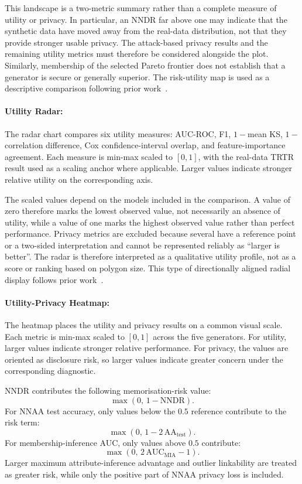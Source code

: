 This landscape is a two-metric summary rather than a complete measure of
utility or privacy. In particular, an NNDR far above one may indicate
that the synthetic data have moved away from the real-data distribution,
not that they provide stronger usable privacy. The attack-based privacy
results and the remaining utility metrics must therefore be considered
alongside the plot. Similarly, membership of the selected Pareto frontier
does not establish that a generator is secure or generally superior. The
risk-utility map is used as a descriptive comparison following prior
work~\cite{thees2025beyond}.


\paragraph{Utility Radar:}
\label{sec:eval:aggregate:radar}
The radar chart compares six utility measures: AUC-ROC, F1,
$1-$mean KS, $1-$correlation difference, Cox confidence-interval
overlap, and feature-importance agreement. Each measure is min-max
scaled to $[0,1]$, with the real-data TRTR result used as a scaling
anchor where applicable. Larger values indicate stronger relative
utility on the corresponding axis.

The scaled values depend on the models included in the comparison. A
value of zero therefore marks the lowest observed value, not necessarily
an absence of utility, while a value of one marks the highest observed
value rather than perfect performance. Privacy metrics are excluded
because several have a reference point or a two-sided interpretation and
cannot be represented reliably as ``larger is better''. The radar is
therefore interpreted as a qualitative utility profile, not as a score or
ranking based on polygon size. This type of directionally aligned radial
display follows prior work~\cite{thees2025beyond}.

\paragraph{Utility-Privacy Heatmap:}
\label{sec:eval:aggregate:heatmap}
The heatmap places the utility and privacy results on a common visual
scale. Each metric is min-max scaled to $[0,1]$ across the five
generators. For utility, larger values indicate stronger relative
performance. For privacy, the values are oriented as disclosure risk, so
larger values indicate greater concern under the corresponding
diagnostic.

NNDR contributes the following memorisation-risk value:
\[
  \max(0,\,1-\mathrm{NNDR}).
\]
For NNAA test accuracy, only values below the $0.5$ reference contribute
to the risk term:
\[
  \max(0,\,1-2\,\mathrm{AA}_{\mathrm{test}}).
\]
For membership-inference AUC, only values above $0.5$ contribute:
\[
  \max(0,\,2\,\mathrm{AUC}_{\mathrm{MIA}}-1).
\]
Larger maximum attribute-inference advantage and outlier linkability are
treated as greater risk, while only the positive part of NNAA privacy
loss is included.

